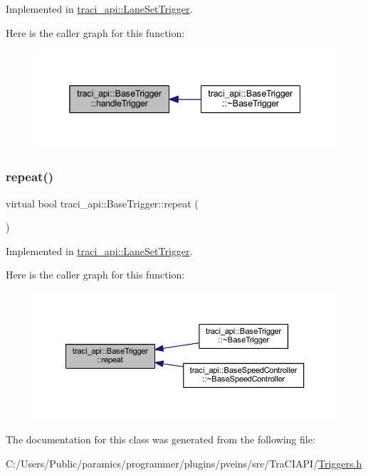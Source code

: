 Implemented in \hyperlink{classtraci__api_1_1_lane_set_trigger_a9bc702339daf8aa0d905e3bab5ff2dc3}{traci\+\_\+api\+::\+Lane\+Set\+Trigger}.

Here is the caller graph for this function\+:
\nopagebreak
\begin{figure}[H]
\begin{center}
\leavevmode
\includegraphics[width=338pt]{classtraci__api_1_1_base_trigger_a2de2824fb1d228d4c04aa15c272017a5_icgraph}
\end{center}
\end{figure}
\mbox{\label{classtraci__api_1_1_base_trigger_a7d2b1ac3f54e42e71eae69f1c7f33943}} 
\subsubsection{\texorpdfstring{repeat()}{repeat()}}
{\footnotesize\ttfamily virtual bool traci\+\_\+api\+::\+Base\+Trigger\+::repeat (\begin{DoxyParamCaption}{ }\end{DoxyParamCaption})\hspace{0.3cm}{\ttfamily [pure virtual]}}



Implemented in \hyperlink{classtraci__api_1_1_lane_set_trigger_ae606560cb760e12b0f1a86407f614e18}{traci\+\_\+api\+::\+Lane\+Set\+Trigger}.

Here is the caller graph for this function\+:
\nopagebreak
\begin{figure}[H]
\begin{center}
\leavevmode
\includegraphics[width=350pt]{classtraci__api_1_1_base_trigger_a7d2b1ac3f54e42e71eae69f1c7f33943_icgraph}
\end{center}
\end{figure}


The documentation for this class was generated from the following file\+:\begin{DoxyCompactItemize}
\item 
C\+:/\+Users/\+Public/paramics/programmer/plugins/pveins/src/\+Tra\+C\+I\+A\+P\+I/\hyperlink{_triggers_8h}{Triggers.\+h}\end{DoxyCompactItemize}
